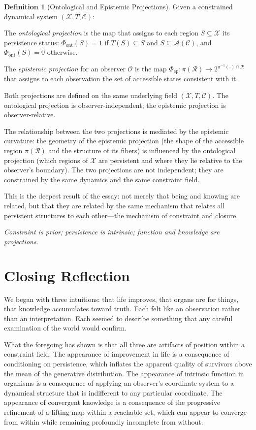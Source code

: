 \documentclass[12pt, a4paper, oneside]{article}
\theoremstyle{plain}
\theoremstyle{definition}
\newtheorem{definition}[theorem]{Definition}
\theoremstyle{remark}
\newcommand{\X}{\mathcal{X}}
\newcommand{\C}{\mathcal{C}}
\newcommand{\Obs}{\mathcal{O}}
\newcommand{\R}{\mathcal{R}}
\newcommand{\A}{\mathcal{A}}
\newcommand{\T}{T}
\newcommand{\proj}{\pi}
\begin{document}
\begin{definition}[Ontological and Epistemic Projections]
Given a constrained dynamical system $(\X, \T, \C)$:

The \emph{ontological projection} is the map that assigns to each region $S \subseteq \X$ its persistence status: $\Phi_\mathrm{ont}(S) = 1$ if $\T(S) \subseteq S$ and $S \subseteq \A(\C)$, and $\Phi_\mathrm{ont}(S) = 0$ otherwise.

The \emph{epistemic projection} for an observer $\Obs$ is the map $\Phi_\mathrm{ep} : \proj(\R) \to 2^{\proj^{-1}(\cdot) \cap \R}$ that assigns to each observation the set of accessible states consistent with it.

Both projections are defined on the same underlying field $(\X, \T, \C)$. The ontological projection is observer-independent; the epistemic projection is observer-relative.
\end{definition}

The relationship between the two projections is mediated by the epistemic curvature: the geometry of the epistemic projection (the shape of the accessible region $\proj(\R)$ and the structure of its fibers) is influenced by the ontological projection (which regions of $\X$ are persistent and where they lie relative to the observer's boundary). The two projections are not independent; they are constrained by the same dynamics and the same constraint field.

This is the deepest result of the essay: not merely that being and knowing are related, but that they are related by the same mechanism that relates all persistent structures to each other---the mechanism of constraint and closure.

\medskip
\noindent\textit{Constraint is prior; persistence is intrinsic; function and knowledge are projections.}
\medskip

\section{Closing Reflection}

We began with three intuitions: that life improves, that organs are for things, that knowledge accumulates toward truth. Each felt like an observation rather than an interpretation. Each seemed to describe something that any careful examination of the world would confirm.

What the foregoing has shown is that all three are artifacts of position within a constraint field. The appearance of improvement in life is a consequence of conditioning on persistence, which inflates the apparent quality of survivors above the mean of the generative distribution. The appearance of intrinsic function in organisms is a consequence of applying an observer's coordinate system to a dynamical structure that is indifferent to any particular coordinate. The appearance of convergent knowledge is a consequence of the progressive refinement of a lifting map within a reachable set, which can appear to converge from within while remaining profoundly incomplete from without.
\end{document}
